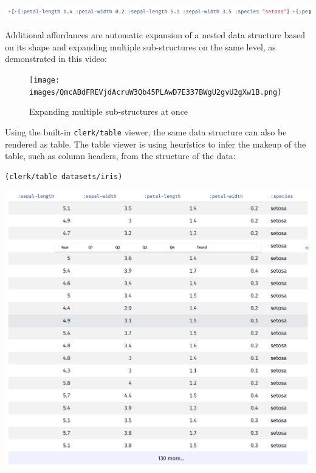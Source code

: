 \documentclass[sigconf,screen]{acmart}
\newcommand{\passthrough}[1]{#1}
\begin{document}
\includegraphics{images/anon-expr-5dtc44qrw3zUvpTfiAXJDH7mtADdRT-result.png}

Additional affordances are automatic expansion of a nested data structure based on its shape and expanding multiple sub-structures on the same level, as demonstrated in this video:

\begin{figure}
\hypertarget{expanding-multiple-sub-structures-at-once}{%
\centering
\texttt{[image: images/QmcABdFREVjdAcruW3Qb45PLAwD7E337BWgU2gvU2gXw1B.png]}
\caption{Expanding multiple sub-structures at once}\label{expanding-multiple-sub-structures-at-once}
}
\end{figure}

Using the built-in \passthrough{\lstinline!clerk/table!} viewer, the same data structure can also be rendered as table. The table viewer is using heuristics to infer the makeup of the table, such as column headers, from the structure of the data:

\begin{minipage}{\linewidth}
\begin{lstlisting}
(clerk/table datasets/iris)
\end{lstlisting}
\end{minipage}

\includegraphics{images/anon-expr-5dtuc4aWdsThsN1ZehoANzcdjAoyh5-result.png}
\end{document}
